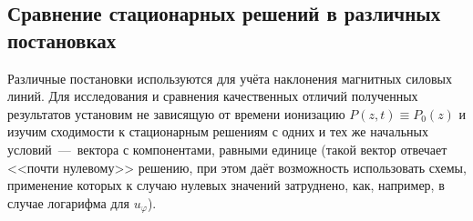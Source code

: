 \documentclass[14pt, a4paper, fleqn, twoside]{extreport}
\begin{document}
\subsection*{Сравнение стационарных решений в различных постановках}

Различные постановки используются для учёта наклонения магнитных силовых линий. Для исследования и сравнения качественных отличий полученных результатов установим не зависящую от времени ионизацию $P(z, t) \equiv P_0(z)$ и изучим сходимости к стационарным решениям с одних и тех же начальных условий~---~вектора с компонентами, равными единице (такой вектор отвечает <<почти нулевому>> решению, при этом даёт возможность использовать схемы, применение которых к случаю нулевых значений затруднено, как, например, в случае логарифма для $u_\varphi$). 
\end{document}
